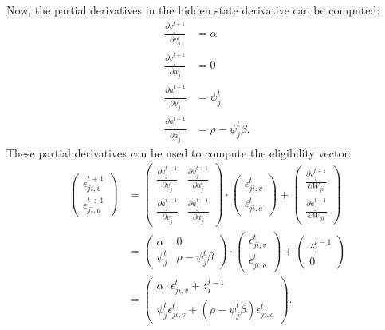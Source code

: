             Now, the partial derivatives in the hidden state derivative can be computed:
            \begin{align}
            \frac{\partial v_j^{t+1}}{\partial v_j^t} &= \alpha\\
            \frac{\partial v_j^{t+1}}{\partial a_j^t} &= 0\\
            \frac{\partial a_j^{t+1}}{\partial v_j^t} &= \psi^t_j\\
            \frac{\partial a_j^{t+1}}{\partial a_j^t} &= \rho - \psi^t_j\beta.
            \end{align}
            These partial derivatives can be used to compute the eligibility vector:
            \begin{align}
            \begin{pmatrix}
            \epsilon_{ji, v}^{t+1}\\
            \epsilon_{ji, a}^{t+1}
            \end{pmatrix}
            &=
            \begin{pmatrix}
            \frac{\partial v^{t+1}_j}{\partial v^t_j} & \frac{\partial v^{t+1}_j}{\partial a^t_j}\\
            \frac{\partial a^{t+1}_j}{\partial v^t_j} & \frac{\partial a^{t+1}_j}{\partial a^t_j}
            \end{pmatrix}
            \cdot
            \begin{pmatrix}
            \epsilon_{ji, v}^t\\
            \epsilon_{ji, a}^t
            \end{pmatrix}
            +
            \begin{pmatrix}
            \frac{\partial v^{t+1}_j}{\partial W_{ji}}\\
            \frac{\partial a^{t+1}_j}{\partial W_{ji}}
            \end{pmatrix}\\
            &=
            \begin{pmatrix}
            \alpha & 0\\
            \psi^t_j & \rho-\psi^t_j\beta
            \end{pmatrix}
            \cdot
            \begin{pmatrix}
            \epsilon_{ji, v}^t\\
            \epsilon_{ji, a}^t
            \end{pmatrix}
            +
            \begin{pmatrix}
            z_i^{t-1}\\
            0
            \end{pmatrix}\label{eq:evector_b}\\
            &=
            \begin{pmatrix}
            \alpha \cdot\epsilon_{ji, v}^t + z_i^{t-1}\\
            \psi^t_j\epsilon^t_{ji, v} + \left(\rho-\psi^t_j\beta\right)\epsilon^t_{ji, a}
            \end{pmatrix}.
            \end{align}

